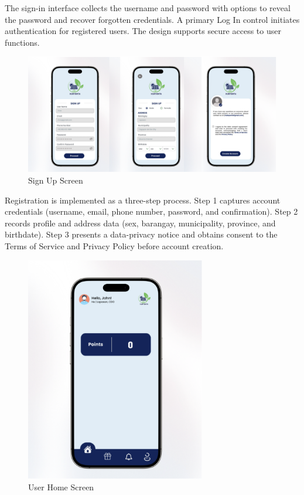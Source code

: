 {  The sign-in interface collects the username and password with options to reveal the password and recover forgotten credentials. A primary Log In control initiates authentication for registered users. The design supports secure access to user functions.
  
   \begin{figure}[H]
  	\centering
  	\caption{Sign Up Screen}
  	\label{fig:signup}
  	\includegraphics[width=1\textwidth]{figures/signup.png}
  \end{figure}
  
  Registration is implemented as a three-step process. Step 1 captures account credentials (username, email, phone number, password, and confirmation). Step 2 records profile and address data (sex, barangay, municipality, province, and birthdate). Step 3 presents a data-privacy notice and obtains consent to the Terms of Service and Privacy Policy before account creation.
  
    \begin{figure}[H]
  	\centering
  	\caption{User Home Screen}
  	\label{fig:user home}
  	\includegraphics[width=0.7\textwidth]{figures/home.png}
  \end{figure}
  
}
